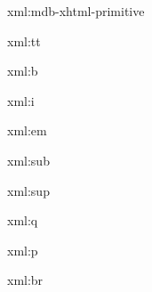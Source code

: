 
\startxmlsetups xml:mdb-xhtml-primitive
\stopxmlsetups


\startxmlsetups xml:tt
	{\tt {}}
\stopxmlsetups

\startxmlsetups xml:b
	{\bf {}}
\stopxmlsetups

\startxmlsetups xml:i
	{\it {}}
\stopxmlsetups

\startxmlsetups xml:em
	{\em {}}
\stopxmlsetups

\startxmlsetups xml:sub
\stopxmlsetups

\startxmlsetups xml:sup
\stopxmlsetups

\startxmlsetups xml:q
\stopxmlsetups

\startxmlsetups xml:p
	\par
\stopxmlsetups

\startxmlsetups xml:br
	\crlf
\stopxmlsetups

